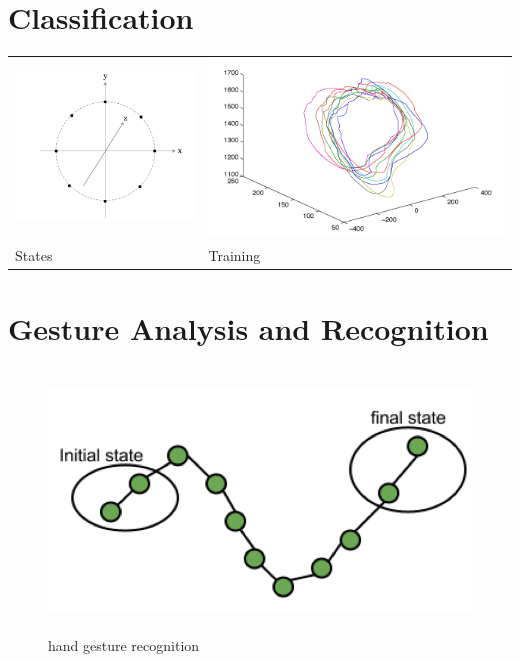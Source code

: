 \section{Classification}
\begin{table}
	[h] \centering 
	\begin{tabular}
		{ll} 
		\includegraphics[width=6cm]{figures/ges-states.png} & 
		\includegraphics[width=10cm]{figures/ges-train.png} \\
		States & Training 
	\end{tabular}
\end{table}

\section{Gesture Analysis and Recognition}
\begin{figure}
	[h] \centering 
	\includegraphics[height=7cm]{figures/ges-rec.png} \caption{ hand gesture recognition} \label{fig:ges:reg} 
\end{figure}
